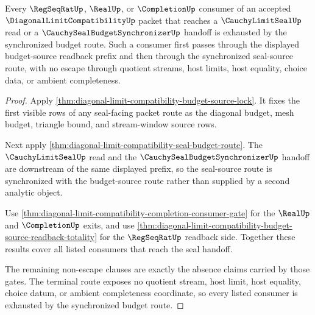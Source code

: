 \begin{theorem}
\label{thm:diagonal-limit-compatibility-synchronized-budget-terminality}
Every $\RegSeqRatUp$, $\RealUp$, or $\CompletionUp$ consumer of an accepted $\DiagonalLimitCompatibilityUp$ packet that reaches a $\CauchyLimitSealUp$ read or a $\CauchySealBudgetSynchronizerUp$ handoff is exhausted by the synchronized budget route. Such a consumer first passes through the displayed budget-source readback prefix and then through the synchronized seal-source route, with no escape through quotient streams, host limits, host equality, choice data, or ambient completeness.
\end{theorem}
\begin{proof}
Apply \autoref{thm:diagonal-limit-compatibility-budget-source-lock}. It fixes the first visible rows of any seal-facing packet route as the diagonal budget, mesh budget, triangle bound, and stream-window source rows.

Next apply \autoref{thm:diagonal-limit-compatibility-seal-budget-route}. The $\CauchyLimitSealUp$ read and the $\CauchySealBudgetSynchronizerUp$ handoff are downstream of the same displayed prefix, so the seal-source route is synchronized with the budget-source route rather than supplied by a second analytic object.

Use \autoref{thm:diagonal-limit-compatibility-completion-consumer-gate} for the $\RealUp$ and $\CompletionUp$ exits, and use \autoref{thm:diagonal-limit-compatibility-budget-source-readback-totality} for the $\RegSeqRatUp$ readback side. Together these results cover all listed consumers that reach the seal handoff.

The remaining non-escape clauses are exactly the absence claims carried by those gates. The terminal route exposes no quotient stream, host limit, host equality, choice datum, or ambient completeness coordinate, so every listed consumer is exhausted by the synchronized budget route.
\end{proof}

